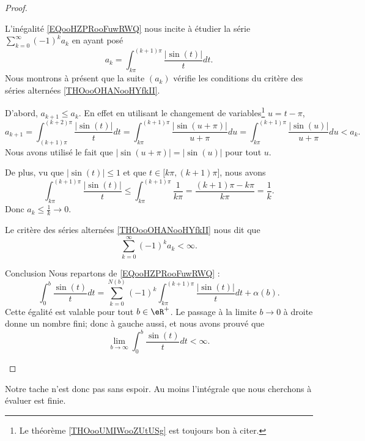 \begin{proof}
\begin{subproof}
		L'inégalité \eqref{EQooHZPRooFuwRWQ} nous incite à étudier la série \( \sum_{k=0}^{\infty}(-1)^ka_k\) en ayant posé
		\begin{equation}
			a_k=\int_{k\pi}^{(k+1)\pi}\frac{ | \sin(t) | }{ t }dt.
		\end{equation}
		Nous montrons à présent que la suite \( (a_k)\) vérifie les conditions du critère des séries alternées \ref{THOooOHANooHYfkII}.

		D'abord, \( a_{k+1}\leq a_k\). En effet en utilisant le changement de variables\footnote{Le théorème \ref{THOooUMIWooZUtUSg} est toujours bon à citer.} \( u=t-\pi\),
		\begin{equation}
			a_{k+1}=\int_{(k+1)\pi}^{(k+2)\pi}\frac{ | \sin(t) | }{ t }dt=\int_{k\pi}^{(k+1)\pi}\frac{ | \sin(u+\pi) | }{ u+\pi }du=\int_{k\pi}^{(k+1)\pi}\frac{ | \sin(u) | }{ u+\pi }du<a_k.
		\end{equation}
		Nous avons utilisé le fait que \( | \sin(u+\pi) |=| \sin(u) |\) pour tout \( u\).

		De plus, vu que \( | \sin(t) |\leq 1\) et que \( t\in\mathopen[ k\pi , (k+1)\pi \mathclose]\), nous avons
		\begin{equation}
			\int_{k\pi}^{(k+1)\pi}\frac{ | \sin(t) | }{ t }\leq \int_{k\pi}^{(k+1)\pi}\frac{1}{ k\pi }=\frac{ (k+1)\pi-k\pi }{ k\pi }=\frac{1}{ k }.
		\end{equation}
		Donc \( a_k\leq\frac{1}{ k }\to 0\).

		Le critère des séries alternées \ref{THOooOHANooHYfkII} nous dit que
		\begin{equation}
			\sum_{k=0}^{\infty}(-1)^ka_k<\infty.
		\end{equation}

		\item[Conclusion]
		Nous repartons de \eqref{EQooHZPRooFuwRWQ} :
		\begin{equation}
			\int_0^b\frac{ \sin(t) }{ t }dt=\sum_{k=0}^{N(b)}(-1)^k\int_{k\pi}^{(k+1)\pi}\frac{ | \sin(t) | }{ t }dt+\alpha(b).
		\end{equation}
		Cette égalité est valable pour tout \( b\in \eR^+\). Le passage à la limite \( b\to 0\) à droite donne un nombre fini; donc à gauche aussi, et nous avons prouvé que
		\begin{equation}
			\lim_{b\to\infty} \int_0^b\frac{ \sin(t) }{ t }dt<\infty.
		\end{equation}
	\end{subproof}
\end{proof}
Notre tache n'est donc pas sans espoir. Au moins l'intégrale que nous cherchons à évaluer est finie.

